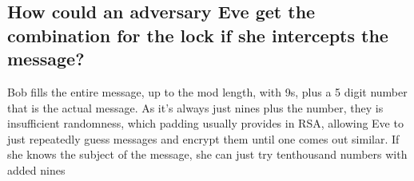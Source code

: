 \subsection{How could an adversary Eve get the combination for the lock if she intercepts the message?}

Bob fills the entire message, up to the mod length, with 9s, plus a 5 digit number that is the actual message. As it's always just nines plus the number, they is insufficient randomness, which padding usually provides in RSA, allowing Eve to just repeatedly guess messages and encrypt them until one comes out similar. If she knows the subject of the message, she can just try tenthousand numbers with added nines






